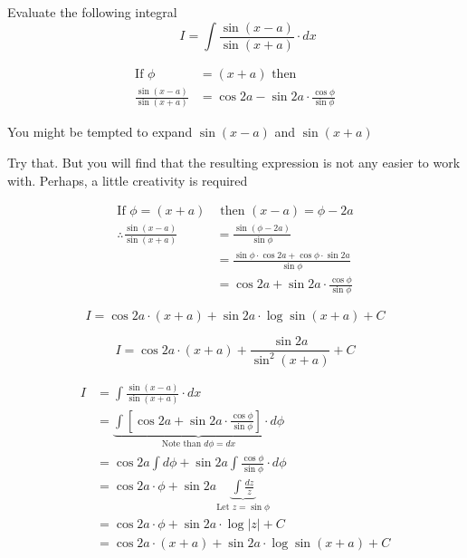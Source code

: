 \documentclass[14pt,fleqn]{extarticle}
\begin{document}
\newcommand\xma{\left(x-a \right)}
\newcommand\xpa{\left(x+a \right)}
\newcommand\pma{ \left(\phi-2a \right)}

Evaluate the following integral 
\[ \qquad I = \int \frac{\sin \xma}{\sin \xpa}\cdot dx \]
%

\newcard

\begin{align}
	\text{If } \phi &= \xpa \text{ then } \\
	\frac{\sin\xma}{\sin \xpa} &= \cos 2a - \sin 2a\cdot \frac{\cos\phi}{\sin\phi}
\end{align}

\newcard 

You might be tempted to expand $\sin\xma$ and $\sin \xpa$ \newline 

Try that. But you will find that the resulting expression is not any easier to work with.  Perhaps, a little creativity is required 

\begin{align}
	\text{If } \phi = \xpa &\text{ then } \xma = \phi - 2a \\
	\therefore \frac{\sin\xma}{\sin\xpa} &= \frac{\sin\pma}{\sin\phi} \\
	&= \frac{\sin\phi\cdot\cos 2a + \cos\phi\cdot\sin 2a}{\sin\phi} \\
	&= \cos 2a + \sin 2a\cdot \frac{\cos\phi}{\sin\phi}
\end{align} 

\newcard 

\[ I = \cos 2a\cdot\xpa + \sin 2a\cdot \log \sin \xpa + C \]

\newcard 

\[ I = \cos 2a\cdot\xpa + \frac{\sin 2a}{\sin^2\xpa} + C \]

\newcard 

\begin{align}
	I &= \int \frac{\sin\xma}{\sin\xpa}\cdot dx \\
	&= \underbrace{\int \left[\cos 2a + \sin 2a\cdot \frac{\cos\phi}{\sin\phi} \right]\cdot d\phi}_{\text{Note than }d\phi = dx} \\
	&= \cos 2a\int d\phi + \sin 2a\int \frac{\cos\phi}{\sin\phi}\cdot d\phi \\
	&= \cos 2a\cdot \phi + \sin 2a \underbrace{\int \frac{dz}{z}}_{\text{Let }z = \sin\phi} \\
	&= \cos 2a\cdot\phi + \sin 2a\cdot\log \vert z\vert + C \\
	&= \cos 2a\cdot\xpa + \sin 2a\cdot \log \sin \xpa + C 
\end{align}
\end{document}

